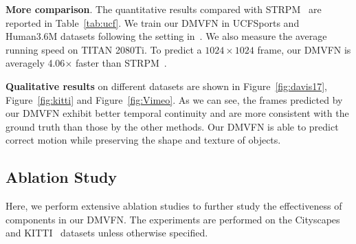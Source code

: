 \documentclass[10pt,twocolumn,letterpaper]{article}
\begin{document}
\begin{table}[!htb]
  \vspace{-2mm}
  \centering
  \caption{\textbf{Comparison between DMVFN and STRPM.}}
  \vspace{-1mm}
  \label{tab:ucf}
    \vspace{-0.2em}
\end{table}

\noindent
\textbf{More comparison}. The quantitative results compared with STRPM~\cite{strpm} are reported in Table~\ref{tab:ucf}. We train our DMVFN in UCFSports and Human3.6M datasets following the setting in~\cite{strpm}. We also measure the average running speed on TITAN 2080Ti. To predict a $1024\times 1024$ frame, our DMVFN is averagely 4.06$\times$ faster than STRPM~\cite{strpm}.


\noindent
\textbf{Qualitative results} on different datasets are shown in Figure~\ref{fig:davis17}, Figure~\ref{fig:kitti} and Figure~\ref{fig:Vimeo}. As we can see, the frames predicted by our DMVFN exhibit better temporal continuity and are more consistent with the ground truth than those by the other methods. Our DMVFN is able to predict correct motion while preserving the shape and texture of objects.

\subsection{Ablation Study}
\label{sec:ablation}
Here, we perform extensive ablation studies to further study the effectiveness of components in our DMVFN. The experiments are performed on the Cityscapes~\cite{cityscapes} and KITTI~\cite{kitti} datasets unless otherwise specified.
\end{document}
